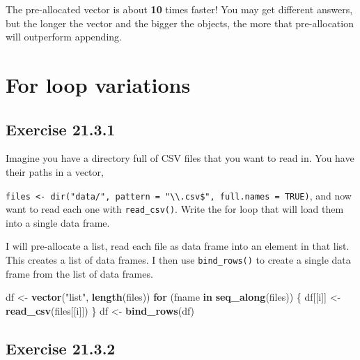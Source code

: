 \documentclass[]{book}
\newenvironment{Shaded}{\begin{snugshade}}{\end{snugshade}}
\newcommand{\ControlFlowTok}[1]{\textcolor[rgb]{0.13,0.29,0.53}{\textbf{#1}}}
\newcommand{\KeywordTok}[1]{\textcolor[rgb]{0.13,0.29,0.53}{\textbf{#1}}}
\newcommand{\NormalTok}[1]{#1}
\newcommand{\StringTok}[1]{\textcolor[rgb]{0.31,0.60,0.02}{#1}}
\theoremstyle{plain}
\theoremstyle{remark}
\theoremstyle{definition}
\theoremstyle{definition}
\theoremstyle{definition}
\theoremstyle{remark}
\begin{document}
The pre-allocated vector is about \textbf{10} times faster! You may get
different answers, but the longer the vector and the bigger the objects,
the more that pre-allocation will outperform appending.

\hypertarget{for-loop-variations}{%
\section{For loop variations}\label{for-loop-variations}}

\hypertarget{exercise-21.3.1}{%
\subsection*{\texorpdfstring{Exercise
{21.3.1}}{Exercise 21.3.1}}\label{exercise-21.3.1}}

Imagine you have a directory full of CSV files that you want to read in.
You have their paths in a vector,

\texttt{files\ \textless{}-\ dir("data/",\ pattern\ =\ "\textbackslash{}\textbackslash{}.csv\$",\ full.names\ =\ TRUE)},
and now want to read each one with \texttt{read\_csv()}. Write the for
loop that will load them into a single data frame.

I will pre-allocate a list, read each file as data frame into an element
in that list. This creates a list of data frames. I then use
\texttt{bind\_rows()} to create a single data frame from the list of
data frames.

\begin{Shaded}
\begin{Highlighting}[]
\NormalTok{df <-}\StringTok{ }\KeywordTok{vector}\NormalTok{(}\StringTok{"list"}\NormalTok{, }\KeywordTok{length}\NormalTok{(files))}
\ControlFlowTok{for}\NormalTok{ (fname }\ControlFlowTok{in} \KeywordTok{seq_along}\NormalTok{(files)) \{}
\NormalTok{  df[[i]] <-}\StringTok{ }\KeywordTok{read_csv}\NormalTok{(files[[i]])}
\NormalTok{\}}
\NormalTok{df <-}\StringTok{ }\KeywordTok{bind_rows}\NormalTok{(df)}
\end{Highlighting}
\end{Shaded}

\hypertarget{exercise-21.3.2}{%
\subsection*{\texorpdfstring{Exercise
{21.3.2}}{Exercise 21.3.2}}\label{exercise-21.3.2}}
\end{document}
